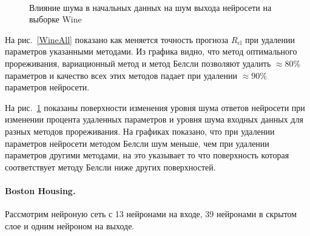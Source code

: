 \begin{figure}[h!t]\center
{}
\\
\caption{Влияние шума в начальных данных на шум выхода нейросети на выборке Wine}
\label{WineNoise}
\end{figure}

На рис.~\ref{WineAll} показано как меняется точность прогноза $R_{\text{cl}}$ при удалении параметров указанными методами. Из графика видно, что метод оптимального прореживания, вариационный метод и метод Белсли позволяют удалить $\approx80\%$ параметров и качество всех этих методов падает при удалении $\approx90\%$ параметров нейросети. 

На рис.~\ref{WineNoise} показаны поверхности изменения уровня шума ответов нейросети при изменении процента удаленных параметров и уровня шума входных данных для разных методов прореживания. На графиках показано, что при удалении параметров нейросети методом Белсли шум меньше, чем при удалении параметров другими методами, на это указывает то что поверхность которая соответствует методу Белсли ниже других поверхностей.

\paragraph{Boston Housing.} Рассмотрим нейроную сеть с 13 нейронами на входе, 39 нейронами в скрытом слое и одним нейроном на выходе.

